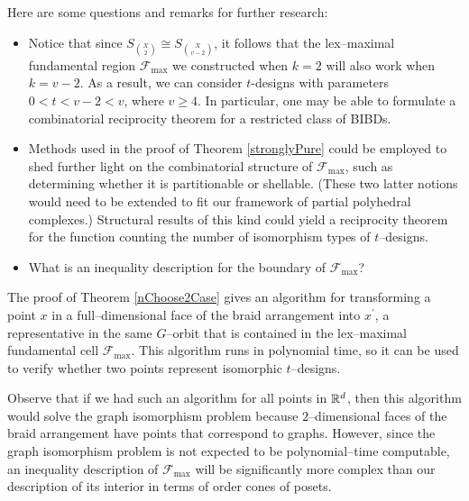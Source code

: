 Here are some questions and remarks for further research:

\begin{itemize}
\item Notice that since $S_{\binom{X}{2}} \cong S_{\binom{X}{v - 2}}$, it follows that the lex--maximal fundamental region $\mathcal{F}_{\max}$ we constructed when $k = 2$ will also work when $k = v - 2$. As a result, we can consider $t$-designs with parameters $0 < t < v - 2 < v$, where $v \ge 4$. In particular, one may be able to formulate a combinatorial reciprocity theorem for a restricted class of BIBDs.

\item Methods used in the proof of Theorem \ref{stronglyPure} could be employed to shed further light on the combinatorial structure of $\mathcal{F}_{\max}$, such as determining whether it is partitionable or shellable. (These two latter notions would need to be extended to fit our framework of partial polyhedral complexes.) Structural results of this kind  could yield a reciprocity theorem for the function counting the number of isomorphism types of $t$--designs.

\item What is an inequality description for the boundary of $\mathcal{F}_{\max}$?
\end{itemize}


The proof of Theorem \ref{nChoose2Case} gives an algorithm for transforming a point $x$ in a full--dimensional face of the braid arrangement into $x^\prime$, a representative in the same $G$--orbit that is contained in the lex--maximal fundamental cell $\mathcal{F}_{\max}$. This algorithm runs in polynomial time, so it can be used to verify whether two points represent isomorphic $t$--designs.

Observe that if we had such an algorithm for all points in $\mathbb{R}^d$, then this algorithm would solve the graph isomorphism problem because $2$--dimensional faces of the braid arrangement have points that correspond to graphs. However, since the graph isomorphism problem is not expected to be polynomial--time computable, an inequality description of $\mathcal{F}_{\max}$ will be significantly more complex than our description of its interior in terms of order cones of posets.
